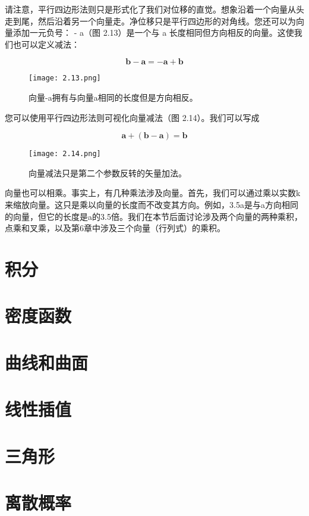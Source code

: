 \documentclass[lang=cn,12pt]{elegantbook}
\begin{document}
请注意，平行四边形法则只是形式化了我们对位移的直觉。想象沿着一个向量从头走到尾，然后沿着另一个向量走。净位移只是平行四边形的对角线。您还可以为向量添加一元负号： - a（图 2.13）是一个与 a 长度相同但方向相反的向量。这使我们也可以定义减法：

$$
  \mathbf{b}-\mathbf{a}=-\mathbf{a}+\mathbf{b}
$$

\begin{figure}[htbp]
  \centering
  \texttt{[image: 2.13.png]}
  \caption{向量-a拥有与向量a相同的长度但是方向相反。}
\end{figure}

您可以使用平行四边形法则可视化向量减法（图 2.14）。我们可以写成

$$
  \mathbf{a}+(\mathbf{b}-\mathbf{a})=\mathbf{b}
$$

\begin{figure}[htbp]
  \centering
  \texttt{[image: 2.14.png]}
  \caption{向量减法只是第二个参数反转的矢量加法。}
\end{figure}

向量也可以相乘。事实上，有几种乘法涉及向量。首先，我们可以通过乘以实数k来缩放向量。这只是乘以向量的长度而不改变其方向。例如，3.5a是与a方向相同的向量，但它的长度是a的3.5倍。我们在本节后面讨论涉及两个向量的两种乘积，点乘和叉乘，以及第6章中涉及三个向量（行列式）的乘积。

\section{积分}

\section{密度函数}

\section{曲线和曲面}

\section{线性插值}

\section{三角形}

\section{离散概率}
\end{document}
